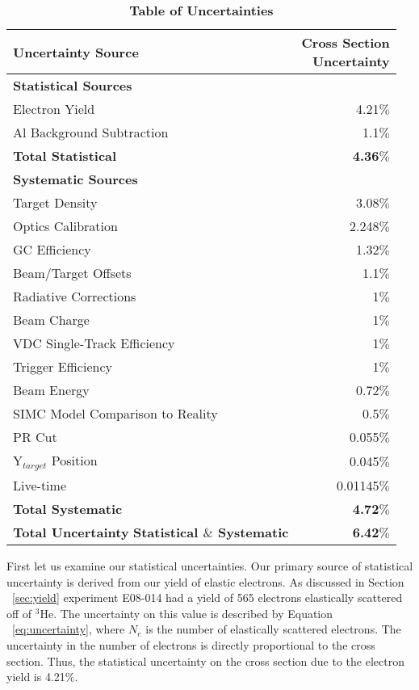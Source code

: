 \begin{table}[!h]
\centering
\begin{tabular}{|l | r |}
\hline
\textbf{Uncertainty Source} & \makecell{\textbf{Cross Section}\\ \textbf{Uncertainty}} \\
\hline
\textbf{Statistical Sources} &  \\ 
\hline
Electron Yield & 4.21$\%$\\
Al Background Subtraction & 1.1$\%$\\
\textbf{Total Statistical} &  \textbf{4.36$\%$}\\
\hline
\textbf{Systematic Sources} &  \\
\hline
Target Density & 3.08$\%$\\
Optics Calibration & 2.248$\%$\\
GC Efficiency & 1.32$\%$\\
Beam/Target Offsets & 1.1$\%$\\
Radiative Corrections & 1$\%$\\
Beam Charge & 1$\%$\\
VDC Single-Track Efficiency & 1$\%$\\
Trigger Efficiency & 1$\%$\\
Beam Energy & 0.72$\%$\\
SIMC Model Comparison to Reality & 0.5$\%$\\
PR Cut & 0.055$\%$\\ 
Y$_{target}$ Position & 0.045$\%$\\
Live-time & 0.01145$\%$\\
\textbf{Total Systematic} &  \textbf{4.72$\%$}\\
\hline
\makecell{\textbf{Total Uncertainty}\\ \textbf{Statistical $\&$ Systematic}} &  \textbf{6.42$\%$}\\
\hline
\end{tabular}
\caption{{\bf{Table of Uncertainties}} }
\label{tab:uncertainty}
\end{table}

First let us examine our statistical uncertainties. Our primary source of statistical uncertainty is derived from our yield of elastic electrons. As discussed in Section ~\ref{sec:yield} experiment E08-014 had a yield of 565 electrons elastically scattered off of $^3$He. The uncertainty on this value is described by Equation ~\ref{eq:uncertainty}, where $N_e$ is the number of elastically scattered electrons. The uncertainty in the number of electrons is directly proportional to the cross section. Thus, the statistical uncertainty on the cross section due to the electron yield is 4.21$\%$.

